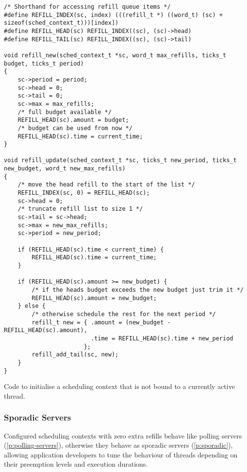 \begin{listing}[h!]
\begin{verbatim}
/* Shorthand for accessing refill queue items */
#define REFILL_INDEX(sc, index) (((refill_t *) ((word_t) (sc) + sizeof(sched_context_t)))[index])
#define REFILL_HEAD(sc) REFILL_INDEX((sc), (sc)->head)
#define REFILL_TAIL(sc) REFILL_INDEX((sc), (sc)->tail)

void refill_new(sched_context_t *sc, word_t max_refills, ticks_t budget, ticks_t period)
{
    sc->period = period;
    sc->head = 0;
    sc->tail = 0;
    sc->max = max_refills;
    /* full budget available */
    REFILL_HEAD(sc).amount = budget;
    /* budget can be used from now */
    REFILL_HEAD(sc).time = current_time;
}

void refill_update(sched_context_t *sc, ticks_t new_period, ticks_t new_budget, word_t new_max_refills)
{
    /* move the head refill to the start of the list */
    REFILL_INDEX(sc, 0) = REFILL_HEAD(sc);
    sc->head = 0;
    /* truncate refill list to size 1 */
    sc->tail = sc->head;
    sc->max = new_max_refills;
    sc->period = new_period;

    if (REFILL_HEAD(sc).time < current_time) {
        REFILL_HEAD(sc).time = current_time;
    }

    if (REFILL_HEAD(sc).amount >= new_budget) {
        /* if the heads budget exceeds the new budget just trim it */
        REFILL_HEAD(sc).amount = new_budget;
    } else {
        /* otherwise schedule the rest for the next period */
        refill_t new = { .amount = (new_budget - REFILL_HEAD(sc).amount),
                         .time = REFILL_HEAD(sc).time + new_period
                       };
        refill_add_tail(sc, new);
    }
}
\end{verbatim}
\caption{Code to initialise a scheduling context that is not bound to a currently active thread.}
\label{list:refill-init}
\end{listing}

\subsubsection{Sporadic Servers}
\label{sec:impl-sporadic}

Configured scheduling contexts with zero extra refills behave like polling servers (\cref{p:polling-servers}),
otherwise they behave as sporadic servers (\cref{p:sporadic}), allowing application developers to
tune the behaviour of threads depending on their preemption levels and execution durations.

